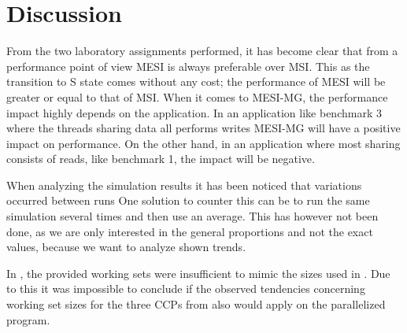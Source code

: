 \section{Discussion}
\label{sec:dis}
From the two laboratory assignments performed, it has become clear that from a performance point of view MESI is always preferable over MSI. This as the transition to S state comes without any cost; the performance of MESI will be greater or equal to that of MSI. When it comes to MESI-MG, the performance impact highly depends on the application. In an application like benchmark 3 where the threads sharing data all performs writes MESI-MG will have a positive impact on performance. On the other hand, in an application where most sharing consists of reads, like benchmark 1, the impact will be negative.

When analyzing the simulation results it has been noticed that variations occurred between runs One solution to counter this can be to run the same simulation several times and then use an average. This has however not been done, as we are only interested in the general proportions and not the exact values, because we want to analyze shown trends.

In , the provided working sets were insufficient to mimic the sizes used in . Due to this it was impossible to conclude if the observed tendencies concerning working set sizes for the three CCPs from  also would apply on the parallelized program.